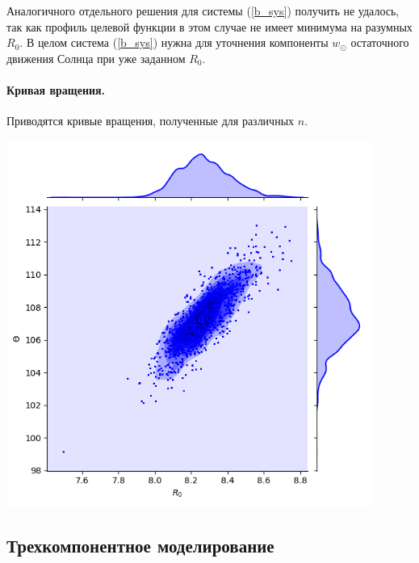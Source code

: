 \documentclass{matmex-diploma-custom}
\begin{document}
Аналогичного отдельного решения для системы (\ref{b_sys}) получить не удалось, так как профиль целевой функции в этом случае не имеет минимума на разумных $R_0$. В целом система (\ref{b_sys}) нужна для уточнения компоненты $w_{\odot}$ остаточного движения Солнца при уже заданном $R_0$.
\pagebreak
\paragraph{Кривая вращения.} Приводятся кривые вращения, полученные для различных $n$. 

        \includegraphics[width=0.9\textwidth]{../../sources/scripts/out.png}
\pagebreak
\subsection{Трехкомпонентное моделирование}
\end{document}
